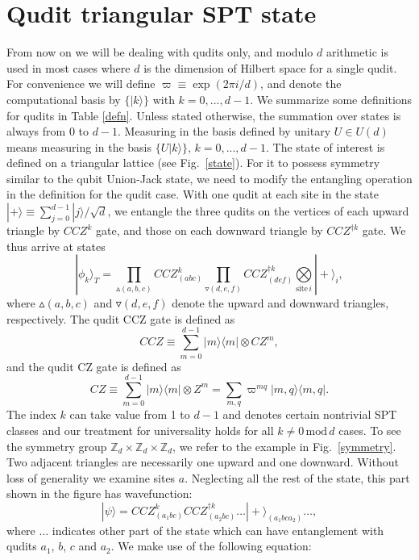 \documentclass[aps,amsfonts,pra,twocolumn,showpacs]{revtex4-1}
\def\ket#1{\vert#1\rangle}
\newcommand{\be}{\begin{equation}}
\newcommand{\ee}{\end{equation}}
\newcommand{\zd}{\mathbb{Z}_d}
\begin{document}
\section{Qudit triangular SPT state}
\label{sec:triangularSPT}
From now on we will be dealing with qudits only, and modulo $d$ arithmetic is used in most cases where $d$ is the dimension of Hilbert space for a single qudit. For convenience we will define $\varpi \equiv \exp{(2\pi i/d)}$, and denote the computational basis by $\{ \ket k \}$ with $k=0, ..., d-1$. We summarize some definitions for qudits in Table \ref{defn}. Unless stated otherwise, the summation over states is always from 0 to $d-1$. Measuring in the basis defined by unitary $U \in U(d)$ means measuring in the basis $\{ U \ket k \}, \, k=0, ..., d-1$.
The state of interest is defined on a triangular lattice (see Fig.~\ref{state}). For it to possess symmetry similar to the qubit Union-Jack state, we need to modify the entangling operation in the definition for the qudit case. With one qudit at each site in the state $|+\rangle\equiv \sum_{j=0}^{d-1}|j\rangle/\sqrt{d}$, we entangle the three qudits on the vertices of each upward triangle by $CCZ^k$ gate, and those on each downward triangle by $CCZ^{\dagger k}$ gate. We thus arrive at states~\cite{Yoshida2016}
	\be
	|\phi_k\rangle_T = \prod_{\vartriangle(a, b, c)} CCZ_{(abc)}^k \prod_{\triangledown(d, e, f)} CCZ^{\dagger k}_{(def)} \underset{\mathrm{site} \, i}{\bigotimes} |+\rangle_i,
	\label{eq:state_defn}
	\ee
where $\vartriangle(a, b, c)$ and $\triangledown(d, e, f)$ denote the upward and downward triangles, respectively. The qudit CCZ gate is defined as 
	\be
	CCZ \equiv \sum_{m=0}^{d-1} |m\rangle \langle m| \otimes CZ^m,
	\ee
	and the qudit CZ gate is defined as
	\be
	CZ \equiv \sum_{m=0}^{d-1} |m\rangle \langle m| \otimes Z^{m}=\sum_{m,q} \varpi^{mq}|m,q\rangle\langle m,q|.
	\ee	
 The index $k$ can take value from 1 to $d-1$ and denotes certain nontrivial SPT classes and   our treatment for universality holds for all $k \neq 0 \, \mathrm{mod} \, d$ cases. To see the symmetry group $\zd \times \zd \times \zd$, we refer to the example in Fig.~\ref{symmetry}. Two adjacent triangles are necessarily one upward and one downward. Without loss of generality we examine sites $a$. Neglecting all the rest of the state, this part shown in the figure has wavefunction:
	\be
	|\psi\rangle = CCZ^k_{(a_1bc)} CCZ^{\dagger k}_{(a_2bc)} \dots |+\rangle_{(a_1bca_2)} \dots,
	\label{example_state}
	\ee
where $\dots$ indicates other part of the state which can have entanglement with qudits $a_1$, $b$, $c$ and $a_2$. We make use of the following equation:
\end{document}

